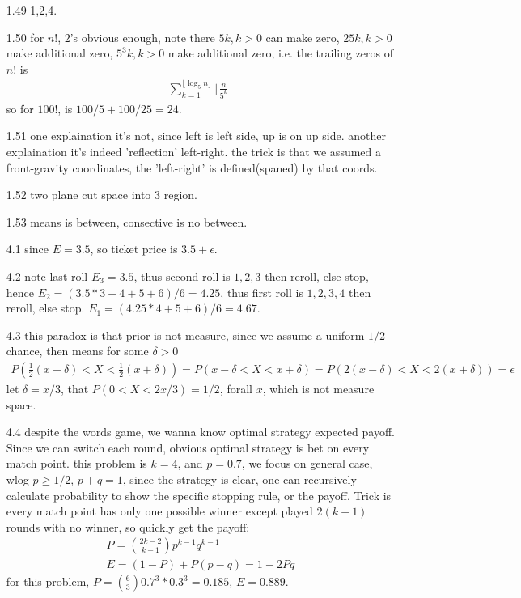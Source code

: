 \documentclass[paper=a4, fontsize=11pt]{scrartcl} %
\numberwithin{equation}{section} %
\numberwithin{figure}{section} %
\numberwithin{table}{section} %
\begin{document}
\begin{itemize}
	\item[1.49] 1,2,4.
	\item[1.50] for $n!$, $2$'s obvious enough, note there $5k,k>0$ can make zero, $25k,k>0$ make additional zero, $5^3k,k>0$ make additional zero, i.e. the trailing zeros of $n!$ is
	\begin{align}
		\sum_{k=1}^{\lfloor \log_5 n \rfloor} \lfloor \frac{n}{5^k}\rfloor
	\end{align}
	so for $100!$, is $100/5 + 100/25= 24$.
	\item[1.51] one explaination it's not, since left is left side, up is on up side. another explaination it's indeed 'reflection' left-right. the trick is that we assumed a front-gravity coordinates, the 'left-right' is defined(spaned) by that coords.
	\item[1.52] two plane cut space into 3 region.
	\item[1.53] means is between, consective is no between.
	\item[4.1] since $E=3.5$, so ticket price is $3.5+\epsilon$.
	\item[4.2] note last roll $E_3=3.5$, thus second roll is $1,2,3$ then reroll, else stop, hence $E_2 = (3.5*3+4+5+6)/6=4.25$, thus first roll is $1,2,3,4$ then reroll, else stop. $E_1 = (4.25*4+5+6)/6=4.67$.
	\item[4.3] this paradox is that prior is not measure, since we assume a uniform $1/2$ chance, then means for some $\delta>0$
	\begin{align}
		P(\frac{1}{2}(x-\delta)<X<\frac{1}{2}(x+\delta)) = P(x-\delta<X<x+\delta)=P(2(x-\delta)<X<2(x+\delta))=\epsilon
	\end{align}
	let $\delta = x/3$, that $P(0<X < 2x/3) = 1/2$, forall $x$, which is not measure space.
	\item[4.4] despite the words game, we wanna know optimal strategy expected payoff. Since we can switch each round, obvious optimal strategy is bet on every match point. this problem is $k=4$, and $p=0.7$, we focus on general case, wlog $p\geq 1/2$, $p+q=1$, since the strategy is clear, one can recursively calculate probability to show the specific stopping rule, or the payoff. Trick is every match point has only one possible winner except played $2(k-1)$ rounds with no winner, so quickly get the payoff:
	\begin{align}
		P = {2k-2 \choose k-1} p^{k-1}q^{k-1}\\
		E = (1-P) + P(p-q) = 1- 2Pq
	\end{align}
	for this problem, $P= {6\choose 3} 0.7^3*0.3^3 = 0.185$, $E=0.889$.

\end{itemize}
\end{document}
